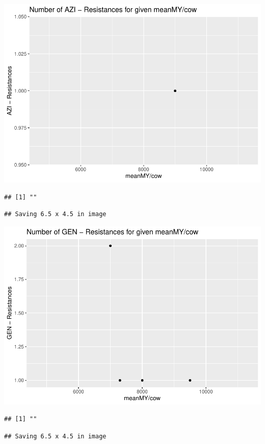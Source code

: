 \documentclass[
]{article}
\begin{document}
\includegraphics{NResistenzen_files/figure-latex/numerical_variables-3.pdf}

\begin{verbatim}
## [1] ""
\end{verbatim}

\begin{verbatim}
## Saving 6.5 x 4.5 in image
\end{verbatim}

\includegraphics{NResistenzen_files/figure-latex/numerical_variables-4.pdf}

\begin{verbatim}
## [1] ""
\end{verbatim}

\begin{verbatim}
## Saving 6.5 x 4.5 in image
\end{verbatim}
\end{document}
